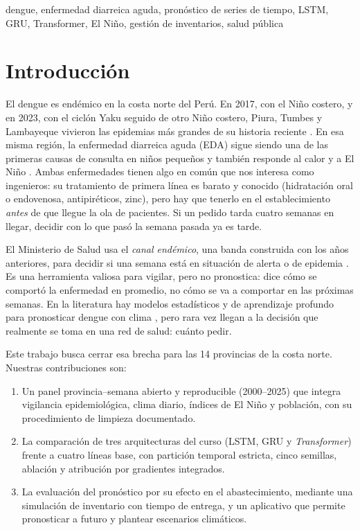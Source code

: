 \documentclass[conference,a4paper]{IEEEtran}
\begin{document}
\begin{IEEEkeywords}
dengue, enfermedad diarreica aguda, pronóstico de series de tiempo, LSTM, GRU, Transformer, El Niño, gestión de inventarios, salud pública
\end{IEEEkeywords}

\section{Introducción}
El dengue es endémico en la costa norte del Perú. En 2017, con el Niño costero, y en 2023, con el ciclón Yaku seguido de otro Niño costero, Piura, Tumbes y Lambayeque vivieron las epidemias más grandes de su historia reciente \cite{rufasto2025peru,mills2024peru}. En esa misma región, la enfermedad diarreica aguda (EDA) sigue siendo una de las primeras causas de consulta en niños pequeños y también responde al calor y a El Niño \cite{checkley2000nino}. Ambas enfermedades tienen algo en común que nos interesa como ingenieros: su tratamiento de primera línea es barato y conocido (hidratación oral o endovenosa, antipiréticos, zinc), pero hay que tenerlo en el establecimiento \emph{antes} de que llegue la ola de pacientes. Si un pedido tarda cuatro semanas en llegar, decidir con lo que pasó la semana pasada ya es tarde.

El Ministerio de Salud usa el \emph{canal endémico}, una banda construida con los años anteriores, para decidir si una semana está en situación de alerta o de epidemia \cite{who2009dengue}. Es una herramienta valiosa para vigilar, pero no pronostica: dice cómo se comportó la enfermedad en promedio, no cómo se va a comportar en las próximas semanas. En la literatura hay modelos estadísticos y de aprendizaje profundo para pronosticar dengue con clima \cite{johansson2019challenge,nguyen2022dengue,mills2024peru}, pero rara vez llegan a la decisión que realmente se toma en una red de salud: cuánto pedir.

Este trabajo busca cerrar esa brecha para las 14 provincias de la costa norte. Nuestras contribuciones son:
\begin{enumerate}
\item Un panel provincia--semana abierto y reproducible (2000--2025) que integra vigilancia epidemiológica, clima diario, índices de El Niño y población, con su procedimiento de limpieza documentado.
\item La comparación de tres arquitecturas del curso (LSTM, GRU y \textit{Transformer}) frente a cuatro líneas base, con partición temporal estricta, cinco semillas, ablación y atribución por gradientes integrados.
\item La evaluación del pronóstico por su efecto en el abastecimiento, mediante una simulación de inventario con tiempo de entrega, y un aplicativo que permite pronosticar a futuro y plantear escenarios climáticos.
\end{enumerate}
\end{document}
